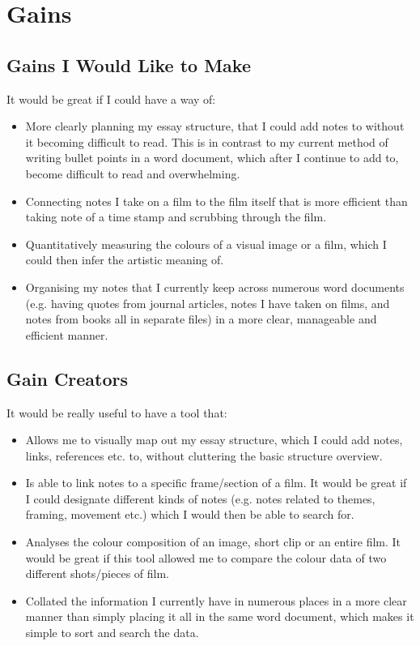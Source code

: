 \documentclass{article}
\begin{document}
\pagebreak

\section*{Gains}
\subsection*{Gains I Would Like to Make}
It would be great if I could have a way of:
\begin{itemize}
    \item More clearly planning my essay structure, that I could add notes to without it becoming difficult to read. This is in contrast to my current method of writing bullet points in a word document, which after I continue to add to, become difficult to read and overwhelming.
    \item Connecting notes I take on a film to the film itself that is more efficient than taking note of a time stamp and scrubbing through the film.
    \item Quantitatively measuring the colours of a visual image or a film, which I could then infer the artistic meaning of.
    \item Organising my notes that I currently keep across numerous word documents (e.g. having quotes from journal articles, notes I have taken on films, and notes from books all in separate files) in a more clear, manageable and efficient manner.
\end{itemize}

\subsection*{Gain Creators}
It would be really useful to have a tool that:
\begin{itemize}
    \item Allows me to visually map out my essay structure, which I could add notes, links, references etc. to, without cluttering the basic structure overview. 
    \item Is able to link notes to a specific frame/section of a film. It would be great if I could designate different kinds of notes (e.g. notes related to themes, framing, movement etc.) which I would then be able to search for.
    \item Analyses the colour composition of an image, short clip or an entire film. It would be great if this tool allowed me to compare the colour data of two different shots/pieces of film.
    \item Collated the information I currently have in numerous places in a more clear manner than simply placing it all in the same word document, which makes it simple to sort and search the data.
\end{itemize}
\end{document}
